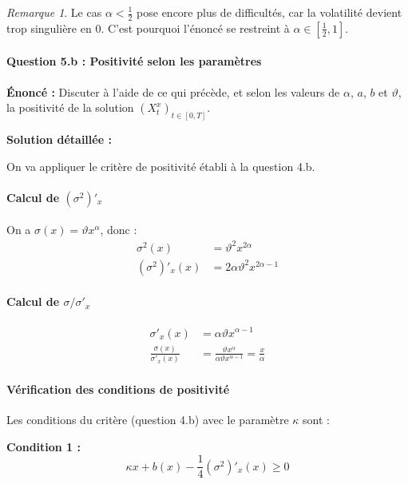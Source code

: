 \documentclass[12pt,a4paper]{article}
\theoremstyle{definition}
\theoremstyle{remark}
\newtheorem*{remark}{Remarque}
\begin{document}
\begin{remark}
Le cas $\alpha < \frac{1}{2}$ pose encore plus de difficultés, car la volatilité devient trop singulière en $0$. C'est pourquoi l'énoncé se restreint à $\alpha \in [\frac{1}{2}, 1]$.
\end{remark}

\paragraph{Question 5.b : Positivité selon les paramètres}

\textbf{Énoncé :} Discuter à l'aide de ce qui précède, et selon les valeurs de $\alpha$, $a$, $b$ et $\vartheta$, la positivité de la solution $(X_t^x)_{t \in [0,T]}$.

\textbf{Solution détaillée :}

On va appliquer le critère de positivité établi à la question 4.b.

\paragraph{Calcul de $(\sigma^2)'_x$}

On a $\sigma(x) = \vartheta x^\alpha$, donc :
\begin{align*}
\sigma^2(x) &= \vartheta^2 x^{2\alpha} \\
(\sigma^2)'_x(x) &= 2\alpha\vartheta^2 x^{2\alpha-1}
\end{align*}

\paragraph{Calcul de $\sigma/\sigma'_x$}

\begin{align*}
\sigma'_x(x) &= \alpha\vartheta x^{\alpha-1} \\
\frac{\sigma(x)}{\sigma'_x(x)} &= \frac{\vartheta x^\alpha}{\alpha\vartheta x^{\alpha-1}} = \frac{x}{\alpha}
\end{align*}

\paragraph{Vérification des conditions de positivité}

Les conditions du critère (question 4.b) avec le paramètre $\kappa$ sont :

\textbf{Condition 1 :}
\[
\kappa x + b(x) - \frac{1}{4}(\sigma^2)'_x(x) \geq 0
\]
\end{document}
